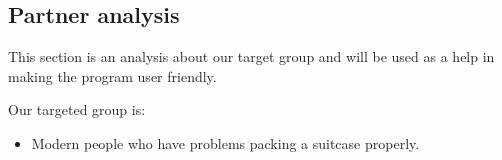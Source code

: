 \subsection{Partner analysis}

This section is an analysis about our target group and will be used as a help in making the program user friendly.

Our targeted group is:
\begin{itemize}
\item Modern people who have problems packing a suitcase properly.
\end{itemize}

